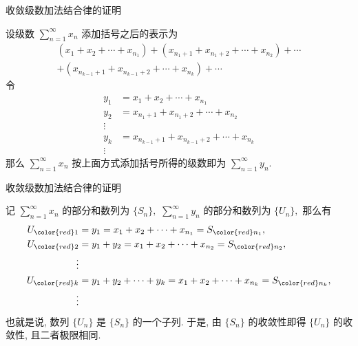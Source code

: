 \begin{frame}{收敛级数加法结合律的证明}

设级数 $\sum\limits_{n=1}^\infty x_n$ 添加括号之后的表示为
\begin{multline*}
(x_1 + x_2 + \cdots + x_{n_1}) + (x_{n_1+1} + x_{n_1+2} + \cdots + x_{n_2}) + \cdots \\
+ (x_{n_{k-1}+1} + x_{n_{k-1}+2} + \cdots + x_{n_k}) + \cdots
\end{multline*}
令
\begin{align*}
y_1 & = x_1 + x_2 + \cdots + x_{n_1} \\
y_2 & = x_{n_1+1} + x_{n_1+2} + \cdots + x_{n_2} \\
\vdots \\
y_k & = x_{n_{k-1}+1} + x_{n_{k-1}+2} + \cdots + x_{n_k} \\
\vdots
\end{align*}
那么 $\sum\limits_{n=1}^\infty x_n$ 按上面方式添加括号所得的级数即为 $\sum\limits_{n=1}^\infty y_n.$

\end{frame}


\begin{frame}{收敛级数加法结合律的证明}

记 $\sum\limits_{n=1}^\infty x_n$ 的部分和数列为 $\{S_n\},$ $\sum\limits_{n=1}^\infty y_n$ 的部分和数列为 $\{U_n\},$ 那么有
\begin{align*}
U_{\color{red}1} & = y_1 = x_1 + x_2 + \cdots + x_{n_1} = S_{\color{red}n_1}, \\
U_{\color{red}2} & = y_1 + y_2 = x_1 + x_2 + \cdots + x_{n_2} = S_{\color{red}n_2}, \\
\vdots \\
U_{\color{red}k} & = y_1 + y_2 + \cdots + y_k = x_1 + x_2 + \cdots + x_{n_k} = S_{\color{red}n_k}, \\
\vdots
\end{align*}
也就是说, 数列 $\{U_n\}$ 是 $\{S_n\}$ 的一个子列.  于是, 由 $\{S_n\}$ 的收敛性即得 $\{U_n\}$ 的收敛性, 且二者极限相同.

\end{frame}


